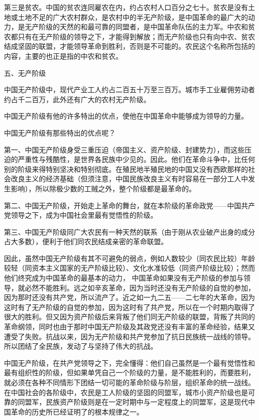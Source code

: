 \documentclass[UTF8, 12pt, a4paper]{ctexrep}
\begin{document}
第三是贫农。中国的贫农连同雇农在内，约占农村人口百分之七十。贫农是没有土地或土地不足的广大农村群众，是农村中的半无产阶级，是中国革命的最广大的动力，是无产阶级的天然的和最可靠的同盟者，是中国革命队伍的主力军。中农和贫农都只有在无产阶级的领导之下，才能得到解放；而无产阶级也只有向中农、贫农结成坚固的联盟，才能领导革命到胜利，否则是不可能的。农民这个名称所包括的内容，主要的也正是指的中农和贫农。

五、无产阶级

中国无产阶级中，现代产业工人约占二百五十万至三百万。城市手工业雇佣劳动者约占千二百万，此外还有广大的农村无产阶级。

中国无产阶级有他的许多特出的优点，使他在中国革命中能够成为领导的力量。

中国无产阶级有那些特出的优点呢？

第一、中国无产阶级身受三重压迫（帝国主义、资产阶级、封建势力），而这些压迫的严重性与残酷性，是世界各民族中少见的。因此。他们在革命斗争中，比任何别的阶级来得特别坚决和特别彻底。在殖民地半殖民地的中国又没有西欧那样的社会改良主义的经济基础（但须注意，中国民族改良主义有时容易在一部分工人中发生影响），所以除极少数的工贼之外，整个阶级都是最革命的。

第二、中国无产阶级，开始走上革命的舞台，就在本阶级的革命政党——中国共产党领导之下，成为中国社会里最有觉悟性的阶级。

第三、中国无产阶级同广大农民有一种天然的联系（由于刚从农业破产出身的成分占大多数），便利于他们同农民结成亲密的革命联盟。

因此，虽然中国无产阶级有其不可避免的弱点，例如人数较少（同农民比较）年龄较轻（同资本主义国家的无产阶级比较）、文化水准较低（同资产阶级比较）；然而他们终究成为中国革命的最基本的动力， 中国革命如果没有无产阶级的参加与领导，就必然不能胜利。远之如辛亥革命，因为当时还没有无产阶级的自觉的参加，因为那时还没有共产党，所以流产了。近之如一九二五——二七年的大革命，因为这时有了无产阶级的自觉的参加，因为这时有了共产党，所以在一个时期内取得了很大的胜利。但又因为资产阶级后来背叛了他们同无产阶级的联盟，背叛了共同的革命纲领，同时也由于那时中国无产阶级及其政党还没有丰富的革命经验，结果又遭受了失败。抗战以来，因为无产阶级和共产党参加了抗日民族统一战线的领导。所以团结了全民族，发动了与坚持了伟大的抗战。

中国无产阶级，在共产党领导之下，完全懂得：他们自己虽然是一个最有觉悟性和最有组织性的阶级，但如果单凭自己一个阶级的力量，是不能胜利的，而要胜利，就必须在各种不同情形下团结一切可能的革命阶级与阶层，组织革命的统一战线。在中国社会的各阶级中，农民是工人阶级的坚固的同盟军，城市小资产阶级也是可靠的同盟军，民族资产阶级则是在一定时期中与一定程度上的同盟军，这是现代中国革命的历史所已经证明了的根本规律之一。
\end{document}

